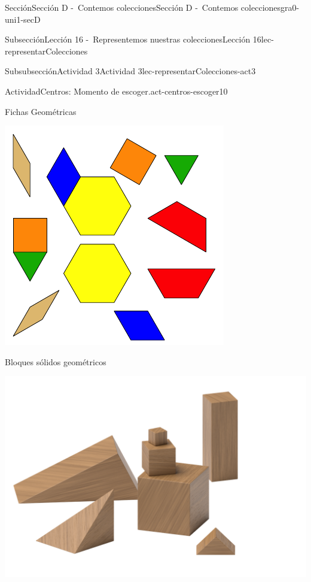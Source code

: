 \documentclass[twoside,10pt,]{article}
\begin{document}
\begin{sectionptx}{Sección}{Sección D -~Contemos colecciones}{}{Sección D -~Contemos colecciones}{}{}{gra0-uni1-secD}
\begin{subsectionptx}{Subsección}{Lección 16 -~Representemos nuestras colecciones}{}{Lección 16}{}{}{lec-representarColecciones}
\begin{subsubsectionptx}{Subsubsección}{Actividad 3}{}{Actividad 3}{}{}{lec-representarColecciones-act3}
\begin{activity}{Actividad}{Centros: Momento de escoger.}{act-centros-escoger10}
\begin{sidebyside}{2}{0.025}{0.025}{0.05}
\begin{sbspanel}{0.45}
\end{sbspanel}%
\begin{sbspanel}{0.45}%
Fichas Geométricas%
\par
\includegraphics[width=\linewidth]{external/svg-source/tikz-file-147344.pdf}
\end{sbspanel}%
\end{sidebyside}%
\begin{sidebyside}{2}{0.025}{0.025}{0.05}%
\begin{sbspanel}{0.45}%
Bloques sólidos geométricos%
\par
\includegraphics[width=\linewidth]{external/png-source/K.1.A Beta Student Workbook.Geoblocks.png}

\end{sbspanel}
\end{sidebyside}
\end{activity}
\end{subsubsectionptx}
\end{subsectionptx}
\end{sectionptx}
\end{document}

